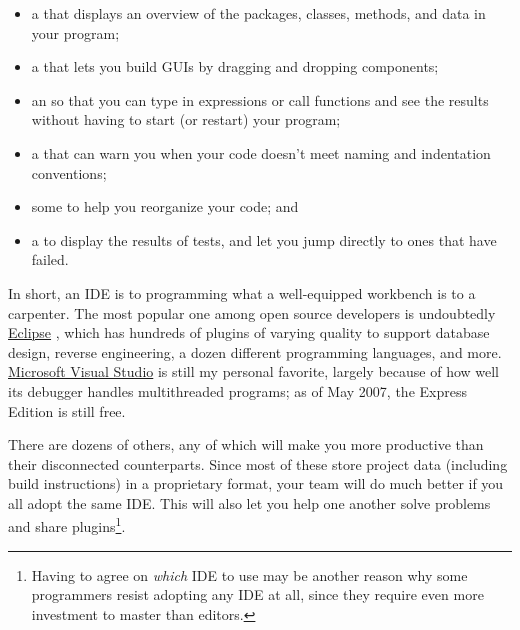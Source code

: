 \documentclass{report}
\begin{document}
\begin{itemize}

  \item a  that displays an overview of the
  packages, classes, methods, and data in your program;

  \item a  that lets you build GUIs by dragging
  and dropping components;

  \item an  so that you can type in
  expressions or call functions and see the results without having to
  start (or restart) your program;

  \item a  that can warn you when your code
  doesn't meet naming and indentation conventions;

  \item some  to help you reorganize your
  code; and

  \item a  to display the results of tests, and
  let you jump directly to ones that have failed.

\end{itemize}

In short, an IDE is to programming what a well-equipped workbench is
to a carpenter.  The most popular one among open source developers is
undoubtedly \url{Eclipse} , which has hundreds of plugins of varying
quality to support database design, reverse engineering, a dozen
different programming languages, and more.  \url{Microsoft Visual
Studio} is still my personal favorite, largely because of how well its
debugger handles multithreaded programs; as of May 2007, the Express
Edition is still free.

There are dozens of others, any of which will make you more productive
than their disconnected counterparts.  Since most of these store
project data (including build instructions) in a proprietary format,
your team will do much better if you all adopt the same IDE.  This
will also let you help one another solve problems and share
plugins\footnote{Having to agree on \emph{which} IDE to use may be
another reason why some programmers resist adopting any IDE at all,
since they require even more investment to master than editors.}.

\end{document}
